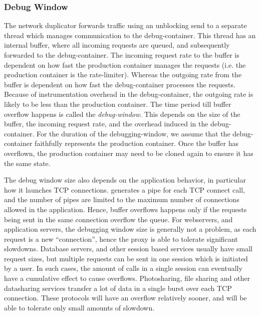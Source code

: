 \par
\noindent \subsubsection{Debug Window} 
The network duplicator forwards traffic using an unblocking send to a separate thread which manages communication to the debug-container. 
This thread has an internal buffer, where all incoming requests are queued, and subsequently forwarded to the debug-container. 
The incoming request rate to the buffer is dependent on how fast the production container manages the requests (i.e. the production container is the rate-limiter).
Whereas the outgoing rate from the buffer is dependent on how fast the debug-container processes the requests.
Because of instrumentation overhead in the debug-container, the outgoing rate is likely to be less than the production container.
The time period till buffer overflow happens is called the \emph{debug-window}.
This depends on the size of the buffer, the incoming request rate, and the overhead induced in the debug-container. 
For the duration of the debugging-window, we assume that the debug-container faithfully represents the production container. 
Once the buffer has overflown, the production container may need to be cloned again to ensure it has the same state.

The debug window size also depends on the application behavior, in particular how it launches TCP connections. 
\parikshan generates a pipe for each TCP connect call, and the number of pipes are limited to the maximum number of connections allowed in the application.
Hence, buffer overflows happens only if the requests being sent in the same connection overflow the queue.
For webservers, and application servers, the debugging window size is generally not a problem, as each request is a new ``connection'', hence the proxy is able to tolerate significant slowdowns.
Database servers, and other session based services usually have small request sizes, but multiple requests can be sent in one session which is initiated by a user. 
In such cases, the amount of calls in a single session can eventually have a cumulative effect to cause overflows.
Photosharing, file sharing and other datasharing services transfer a lot of data in a single burst over each TCP connection. 
These protocols will have an overflow relatively sooner, and will be able to tolerate only small amounts of slowdown. 

